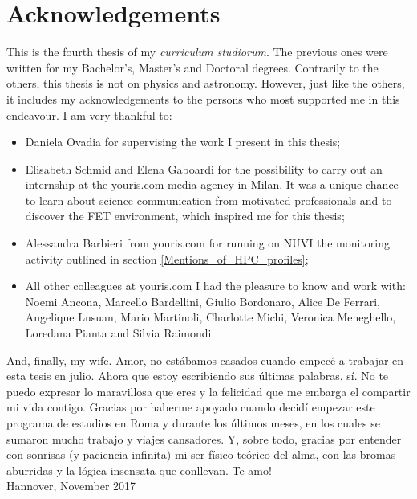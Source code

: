 \chapter*{Acknowledgements}
This is the fourth thesis of my \textit{curriculum studiorum}. The previous ones were written for my Bachelor's, Master's and Doctoral degrees. Contrarily to the others, this thesis is not on physics and astronomy. However, just like the others, it includes my acknowledgements to the persons who most supported me in this endeavour. I am very thankful to:
  
\begin{itemize}
 \item Daniela Ovadia for supervising the work I present in this thesis;
 \item Elisabeth Schmid and Elena Gaboardi for the possibility to carry out an internship at the youris.com media agency in Milan. It was a unique chance to learn about science communication from motivated professionals and to discover the FET environment, which inspired me for this thesis; 
 \item Alessandra Barbieri from youris.com for running on NUVI the monitoring activity outlined in section \ref{Mentions_of_HPC_profiles};
 \item All other colleagues at youris.com I had the pleasure to know and work with: Noemi Ancona, Marcello Bardellini, Giulio Bordonaro, Alice De Ferrari, Angelique Lusuan, Mario Martinoli, Charlotte Michi, Veronica Meneghello, Loredana Pianta and Silvia Raimondi.
\end{itemize}

\noindent
And, finally, my wife. Amor, no est\'abamos casados cuando empec\'e a trabajar en esta tesis  en julio. Ahora que estoy escribiendo sus \'ultimas palabras, s\'i. No te puedo expresar lo maravillosa que eres y la felicidad que me embarga el compartir mi vida contigo. Gracias por haberme apoyado cuando decid\'i empezar este programa de estudios en Roma y durante los \'ultimos meses, en los cuales se sumaron mucho trabajo y viajes cansadores. Y, sobre todo, gracias por entender con sonrisas (y paciencia infinita) mi ser f\'isico te\'orico del alma, con las bromas aburridas y la l\'ogica insensata que conllevan. Te amo! \\

\noindent
Hannover, November 2017